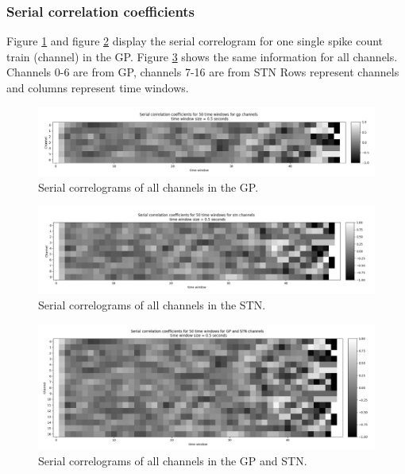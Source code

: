 \documentclass{article}
\begin{document}
\subsubsection{Serial correlation coefficients}

Figure \ref{fig:corr1} and figure \ref{fig:corr2} display the serial correlogram for one single spike count train (channel) in the GP. 
Figure \ref{fig:corr3} shows the same information for all channels. Channels 0-6 are from GP, channels 7-16 are from STN
Rows represent channels and columns represent time windows.

\begin{figure}[H]
    \centering
    \centerline{\includegraphics[width=1\textwidth]{images/spiking/autocorr_gp.png}}
    \caption{Serial correlograms of all channels in the GP.}
    \label{fig:corr1}
\end{figure}

\begin{figure}[H]
    \centering
    \centerline{\includegraphics[width=1\textwidth]{images/spiking/autocorr_stn.png}}
    \caption{Serial correlograms of all channels in the STN.}
    \label{fig:corr2}
\end{figure}

\begin{figure}[H]
    \centering
    \centerline{\includegraphics[width=1\textwidth]{images/spiking/autocorr_all.png}}
    \caption{Serial correlograms of all channels in the GP and STN.}
    \label{fig:corr3}
\end{figure}
\end{document}
